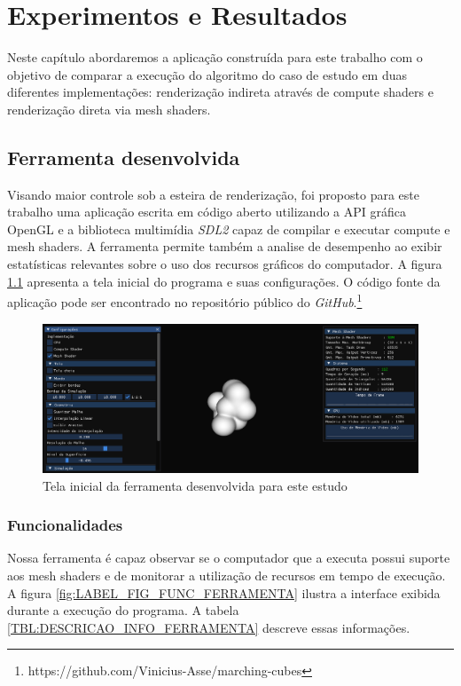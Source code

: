 \chapter{Experimentos e Resultados}\label{chp:LABEL_EXPERIMENTOS}

Neste capítulo abordaremos a aplicação construída para este trabalho com o objetivo de comparar a execução do algoritmo do caso de estudo em duas diferentes implementações: renderização indireta através de compute shaders e renderização direta via mesh shaders.

\section{Ferramenta desenvolvida}\label{sec:LABEL_FERRAMENTA_DESENVOLVIDA}

Visando maior controle sob a esteira de renderização, foi proposto para este trabalho uma aplicação escrita em código aberto utilizando a API gráfica OpenGL e a biblioteca multimídia \textit{SDL2} capaz de compilar e executar compute e mesh shaders. A ferramenta permite também a analise de desempenho ao exibir estatísticas relevantes sobre o uso dos recursos gráficos do computador. A figura \ref{fig:LABEL_FIG_MESH_SHADER_TOOL} apresenta a tela inicial do programa e suas configurações. O código fonte da aplicação pode ser encontrado no repositório público do \textit{GitHub}.\footnote{https://github.com/Vinicius-Asse/marching-cubes}

\begin{figure}
\centering
\includegraphics[width=1\textwidth]{imagens/InterfaceFerramenta.png}
\caption{Tela inicial da ferramenta desenvolvida para este estudo}
\label{fig:LABEL_FIG_MESH_SHADER_TOOL}
\end{figure}

\subsection{Funcionalidades}\label{sec:LABEL_FERRAMENTA_DESENVOLVIDA_FUNCIONALIDADES}
Nossa ferramenta é capaz observar se o computador que a executa possui suporte aos mesh shaders e de monitorar a utilização de recursos em tempo de execução. A figura \ref{fig:LABEL_FIG_FUNC_FERRAMENTA} ilustra a interface exibida durante a execução do programa. A tabela \ref{TBL:DESCRICAO_INFO_FERRAMENTA} descreve essas informações.

